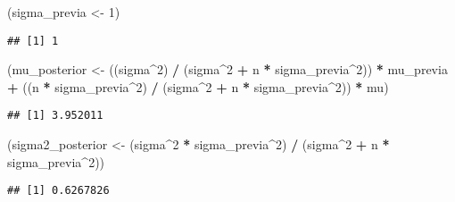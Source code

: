 \documentclass[
  12pt,
]{book}
\newenvironment{Shaded}{\begin{snugshade}}{\end{snugshade}}
\newcommand{\DecValTok}[1]{\textcolor[rgb]{0.00,0.00,0.81}{#1}}
\newcommand{\NormalTok}[1]{#1}
\newcommand{\OperatorTok}[1]{\textcolor[rgb]{0.81,0.36,0.00}{\textbf{#1}}}
\newcommand{\StringTok}[1]{\textcolor[rgb]{0.31,0.60,0.02}{#1}}
\begin{document}
\begin{Shaded}
\begin{Highlighting}[]
\NormalTok{(sigma\_previa \textless{}{-}}\StringTok{ }\DecValTok{1}\NormalTok{)}
\end{Highlighting}
\end{Shaded}

\begin{verbatim}
## [1] 1
\end{verbatim}

\begin{Shaded}
\begin{Highlighting}[]
\NormalTok{(mu\_posterior \textless{}{-}}\StringTok{ }\NormalTok{((sigma}\OperatorTok{\^{}}\DecValTok{2}\NormalTok{) }\OperatorTok{/}\StringTok{ }\NormalTok{(sigma}\OperatorTok{\^{}}\DecValTok{2} \OperatorTok{+}\StringTok{ }\NormalTok{n }\OperatorTok{*}\StringTok{ }\NormalTok{sigma\_previa}\OperatorTok{\^{}}\DecValTok{2}\NormalTok{)) }\OperatorTok{*}\StringTok{ }\NormalTok{mu\_previa }\OperatorTok{+}\StringTok{ }\NormalTok{((n }\OperatorTok{*}\StringTok{ }\NormalTok{sigma\_previa}\OperatorTok{\^{}}\DecValTok{2}\NormalTok{) }\OperatorTok{/}\StringTok{ }\NormalTok{(sigma}\OperatorTok{\^{}}\DecValTok{2} \OperatorTok{+}\StringTok{ }\NormalTok{n }\OperatorTok{*}\StringTok{ }\NormalTok{sigma\_previa}\OperatorTok{\^{}}\DecValTok{2}\NormalTok{)) }\OperatorTok{*}\StringTok{ }\NormalTok{mu)}
\end{Highlighting}
\end{Shaded}

\begin{verbatim}
## [1] 3.952011
\end{verbatim}

\begin{Shaded}
\begin{Highlighting}[]
\NormalTok{(sigma2\_posterior \textless{}{-}}\StringTok{ }\NormalTok{(sigma}\OperatorTok{\^{}}\DecValTok{2} \OperatorTok{*}\StringTok{ }\NormalTok{sigma\_previa}\OperatorTok{\^{}}\DecValTok{2}\NormalTok{) }\OperatorTok{/}\StringTok{ }\NormalTok{(sigma}\OperatorTok{\^{}}\DecValTok{2} \OperatorTok{+}\StringTok{ }\NormalTok{n }\OperatorTok{*}\StringTok{ }\NormalTok{sigma\_previa}\OperatorTok{\^{}}\DecValTok{2}\NormalTok{))}
\end{Highlighting}
\end{Shaded}

\begin{verbatim}
## [1] 0.6267826
\end{verbatim}
\end{document}
